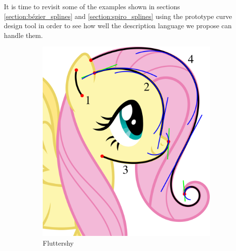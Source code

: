 \documentclass[a4paper]{article}
\begin{document}
			It is time to revisit some of the examples shown in sections \ref{section:bézier_splines} and \ref{section:spiro_splines} using the prototype curve design tool in order to see how well the description language we propose can handle them.

			\begin{figure}[htb]
				\centering
				\begin{subfigure}[b]{8 \textwidth / 13}
					\includegraphics[width=\textwidth]{content/output/examples_prototype_fluttershy.pdf}
					\caption{Fluttershy \cite{fluttershy}}
					\label{figure:examples_prototype_fluttershy}
				\end{subfigure}%
				\begin{subfigure}[b]{5 \textwidth / 13}

\end{subfigure}
\end{figure}
\end{document}
